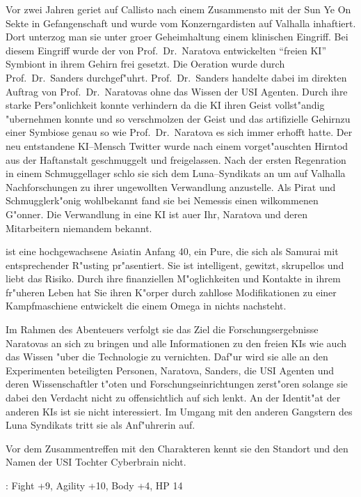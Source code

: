 Vor zwei Jahren geriet \xl{} auf Callisto nach einem Zusammensto\3 mit der Sun Ye On Sekte in Gefangenschaft und wurde vom Konzerngardisten auf Valhalla inhaftiert. Dort unterzog man sie unter gro\3er Geheimhaltung einem klinischen Eingriff. Bei diesem Eingriff wurde der von Prof.~Dr.~Naratova entwickelten ``freien KI'' Symbiont in ihrem Gehirn frei gesetzt. Die Oeration wurde durch Prof.~Dr.~Sanders durchgef"uhrt. Prof.~Dr.~Sanders handelte dabei im direkten Auftrag von Prof.~Dr.~Naratovas ohne das Wissen der USI Agenten. Durch ihre starke Pers"onlichkeit konnte \xl{} verhindern da\3 die KI ihren Geist vollst"andig "ubernehmen konnte und so verschmolzen der Geist und das artifizielle Gehirnzu einer Symbiose genau so wie Prof.~Dr.~Naratova es sich immer erhofft hatte. Der neu entstandene KI--Mensch Twitter wurde nach einem vorget"auschten Hirntod aus der Haftanstalt geschmuggelt und freigelassen. Nach der ersten Regenration in einem Schmuggellager schlo\3 sie sich \xl{} dem Luna--Syndikats an um auf Valhalla Nachforschungen zu ihrer ungewollten Verwandlung anzustelle. Als Pirat und Schmugglerk"onig wohlbekannt fand sie bei Nemessis einen wilkommenen G"onner. Die Verwandlung in eine KI ist au\3er Ihr, Naratova und deren Mitarbeitern niemandem bekannt.

\xl{} ist eine hochgewachsene Asiatin Anfang 40, ein Pure, die sich als Samurai mit entsprechender R"usting pr"asentiert. Sie ist intelligent, gewitzt, skrupellos und liebt das Risiko. Durch ihre finanziellen M"oglichkeiten und Kontakte in ihrem fr"uheren Leben hat Sie ihren K"orper durch zahllose Modifikationen zu einer Kampfmaschiene entwickelt die einem Omega in nichts nachsteht.

Im Rahmen des Abenteuers verfolgt sie das Ziel die Forschungsergebnisse Naratovas an sich zu bringen und alle Informationen zu den freien KIs wie auch das Wissen "uber die Technologie zu vernichten. Daf"ur wird sie alle an den Experimenten beteiligten Personen, Naratova, Sanders, die USI Agenten und deren Wissenschaftler t"oten und Forschungseinrichtungen zerst"oren solange sie dabei den Verdacht nicht zu offensichtlich auf sich lenkt. An der Identit"at der anderen KIs ist sie nicht interessiert. Im Umgang mit den anderen  Gangstern des Luna Syndikats tritt sie als Anf"uhrerin auf.

Vor dem Zusammentreffen mit den Charakteren kennt sie den Standort und den Namen der USI Tochter Cyberbrain nicht.

  : Fight +9, Agility +10, Body +4, HP 14

